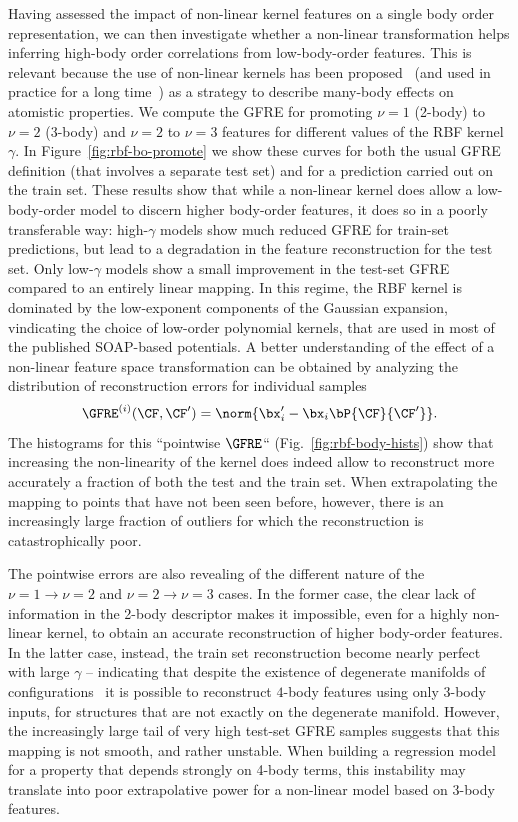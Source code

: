 Having assessed the impact of non-linear kernel features on a single body order representation, we can then investigate whether a non-linear transformation helps inferring high-body order correlations from low-body-order features.
This is relevant because the use of non-linear kernels has been proposed~\cite{glie+18prb} (and used in practice for a long time~\cite{bart+10prl,bart+13prb}) as a strategy to describe many-body effects on atomistic properties.
We compute the GFRE for promoting $\nu=1$ (2-body) to $\nu=2$ (3-body) and $\nu=2$ to $\nu=3$ features for different values of the RBF kernel $\gamma$. 
In Figure~\ref{fig:rbf-bo-promote} we show these curves for both the usual GFRE definition (that involves a separate test set) and for a prediction carried out on the train set. 
These results show that while a non-linear kernel does allow a low-body-order model to discern higher body-order features, it does so in a poorly transferable way: high-$\gamma$ models show much reduced GFRE for train-set predictions, but lead to a degradation in the feature reconstruction for the test set. 
Only low-$\gamma$ models show a small improvement in the test-set GFRE compared to an entirely linear mapping. In this regime, the RBF kernel is dominated by the low-exponent components of the Gaussian expansion, vindicating the choice of low-order polynomial kernels, that are used in most of the published SOAP-based potentials. 
A better understanding of the effect of a non-linear feature space transformation can be obtained by analyzing the distribution of reconstruction errors for individual samples
\begin{equation}
\GFRE^{(i)}(\CF,\CF^{\prime}) = \norm{\bx^{\prime}_i - \bx_i\bP{\CF}{\CF^{\prime}}}. 
\label{eq:pointwise_GFRE}
\end{equation}
The histograms for this ``pointwise $\GFRE$`` (Fig.~\ref{fig:rbf-body-hists}) show that increasing the non-linearity of the kernel does indeed allow to reconstruct more accurately a fraction of both the test and the train set. When extrapolating the mapping to points that have not been seen before, however, there is an increasingly large fraction of outliers for which the reconstruction is catastrophically poor.

The pointwise errors are also revealing of the different nature of the $\nu=1\rightarrow \nu=2$ and $\nu=2\rightarrow \nu=3$ cases.
In the former case, the clear lack of information in the 2-body descriptor makes it impossible, even for a highly non-linear kernel, to obtain an accurate reconstruction of higher body-order features.
In the latter case, instead, the train set reconstruction become nearly perfect with large $\gamma$ -- indicating that despite the existence of degenerate manifolds of configurations~\cite{pozd+20prl} it is possible to reconstruct $4$-body features using only $3$-body inputs, for  structures that are not exactly on the degenerate manifold.
However, the increasingly large tail of very high test-set GFRE samples suggests that this mapping is not smooth, and rather unstable. When building a regression model for a property that depends strongly on 4-body terms, this instability may translate into poor extrapolative power for a non-linear model based on 3-body features.

